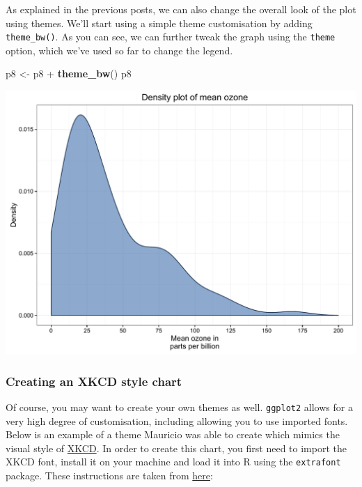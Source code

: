 \documentclass[]{article}
\newenvironment{Shaded}{\begin{snugshade}}{\end{snugshade}}
\newcommand{\KeywordTok}[1]{\textcolor[rgb]{0.13,0.29,0.53}{\textbf{{#1}}}}
\newcommand{\StringTok}[1]{\textcolor[rgb]{0.31,0.60,0.02}{{#1}}}
\newcommand{\NormalTok}[1]{{#1}}
\begin{document}
As explained in the previous posts, we can also change the overall look
of the plot using themes. We'll start using a simple theme customisation
by adding \texttt{theme\_bw()}. As you can see, we can further tweak the
graph using the \texttt{theme} option, which we've used so far to change
the legend.

\begin{Shaded}
\begin{Highlighting}[]
\NormalTok{p8 <-}\StringTok{ }\NormalTok{p8 +}\StringTok{ }\KeywordTok{theme_bw}\NormalTok{()}
\NormalTok{p8}
\end{Highlighting}
\end{Shaded}

\begin{center}\includegraphics{0_all_posts_pdf/density_9-1} \end{center}

\subsubsection{Creating an XKCD style
chart}\label{creating-an-xkcd-style-chart-7}

Of course, you may want to create your own themes as well.
\texttt{ggplot2} allows for a very high degree of customisation,
including allowing you to use imported fonts. Below is an example of a
theme Mauricio was able to create which mimics the visual style of
\href{http://xkcd.com/}{XKCD}. In order to create this chart, you first
need to import the XKCD font, install it on your machine and load it
into R using the \texttt{extrafont} package. These instructions are
taken from
\href{https://www.google.com.au/url?sa=t\&rct=j\&q=\&esrc=s\&source=web\&cd=1\&ved=0ahUKEwiWzafchdPJAhVBpJQKHe_LDT8QFggbMAA\&url=https\%3A\%2F\%2Fcran.r-project.org\%2Fweb\%2Fpackages\%2Fxkcd\%2Fvignettes\%2Fxkcd-intro.pdf\&usg=AFQjCNE-KciGY14e-Q1buYIVmTFC0ht__Q\&sig2=DZUwkvIHwfNWtTtkcz94jg}{here}:
\end{document}
